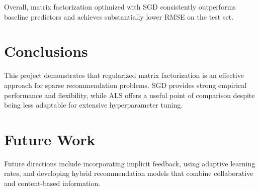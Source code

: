 \documentclass[11pt]{article}
\begin{document}
Overall, matrix factorization optimized with SGD consistently outperforms baseline predictors and achieves substantially lower RMSE on the test set.

\section{Conclusions}
This project demonstrates that regularized matrix factorization is an effective approach for sparse recommendation problems. SGD provides strong empirical performance and flexibility, while ALS offers a useful point of comparison despite being less adaptable for extensive hyperparameter tuning.

\section{Future Work}
Future directions include incorporating implicit feedback, using adaptive learning rates, and developing hybrid recommendation models that combine collaborative and content-based information.
\end{document}
